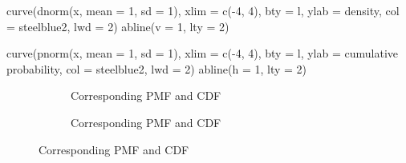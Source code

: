 \documentclass[
  letterpaper,
  DIV=11,
  numbers=noendperiod]{scrreprt}
\newenvironment{Shaded}{\begin{snugshade}}{\end{snugshade}}
\newcommand{\AttributeTok}[1]{\textcolor[rgb]{0.40,0.45,0.13}{#1}}
\newcommand{\DecValTok}[1]{\textcolor[rgb]{0.68,0.00,0.00}{#1}}
\newcommand{\FunctionTok}[1]{\textcolor[rgb]{0.28,0.35,0.67}{#1}}
\newcommand{\NormalTok}[1]{\textcolor[rgb]{0.00,0.23,0.31}{#1}}
\newcommand{\SpecialCharTok}[1]{\textcolor[rgb]{0.37,0.37,0.37}{#1}}
\newcommand{\StringTok}[1]{\textcolor[rgb]{0.13,0.47,0.30}{#1}}
\begin{document}
\begin{Shaded}
\begin{Highlighting}[]
\FunctionTok{curve}\NormalTok{(}\FunctionTok{dnorm}\NormalTok{(x, }\AttributeTok{mean =} \DecValTok{1}\NormalTok{, }\AttributeTok{sd =} \DecValTok{1}\NormalTok{), }\AttributeTok{xlim =} \FunctionTok{c}\NormalTok{(}\SpecialCharTok{{-}}\DecValTok{4}\NormalTok{, }\DecValTok{4}\NormalTok{),}
\AttributeTok{bty =} \StringTok{\textquotesingle{}l\textquotesingle{}}\NormalTok{, }\AttributeTok{ylab =} \StringTok{\textquotesingle{}density\textquotesingle{}}\NormalTok{,}
\AttributeTok{col =} \StringTok{\textquotesingle{}steelblue2\textquotesingle{}}\NormalTok{, }\AttributeTok{lwd =} \DecValTok{2}\NormalTok{)}
\FunctionTok{abline}\NormalTok{(}\AttributeTok{v =} \DecValTok{1}\NormalTok{, }\AttributeTok{lty =} \DecValTok{2}\NormalTok{)}

\FunctionTok{curve}\NormalTok{(}\FunctionTok{pnorm}\NormalTok{(x, }\AttributeTok{mean =} \DecValTok{1}\NormalTok{, }\AttributeTok{sd =} \DecValTok{1}\NormalTok{), }\AttributeTok{xlim =} \FunctionTok{c}\NormalTok{(}\SpecialCharTok{{-}}\DecValTok{4}\NormalTok{, }\DecValTok{4}\NormalTok{),}
\AttributeTok{bty =} \StringTok{\textquotesingle{}l\textquotesingle{}}\NormalTok{, }\AttributeTok{ylab =} \StringTok{\textquotesingle{}cumulative probability\textquotesingle{}}\NormalTok{,}
\AttributeTok{col =} \StringTok{\textquotesingle{}steelblue2\textquotesingle{}}\NormalTok{, }\AttributeTok{lwd =} \DecValTok{2}\NormalTok{)}
\FunctionTok{abline}\NormalTok{(}\AttributeTok{h =} \DecValTok{1}\NormalTok{, }\AttributeTok{lty =} \DecValTok{2}\NormalTok{)}
\end{Highlighting}
\end{Shaded}

\begin{figure}

\begin{minipage}{0.50\linewidth}

\begin{figure}[H]


\caption{\label{fig-norm.dist-1}Corresponding PMF and CDF}

\end{figure}%

\end{minipage}%
%
\begin{minipage}{0.50\linewidth}

\begin{figure}[H]


\caption{\label{fig-norm.dist-2}Corresponding PMF and CDF}

\end{figure}%

\end{minipage}%

\end{figure}%
\end{document}
